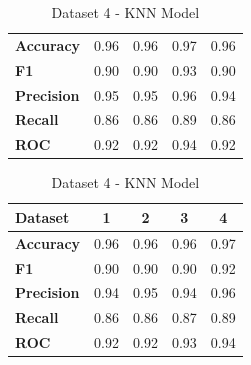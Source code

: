 \begin{table}[H]
\begin{subtable}[H]{0.45\textwidth}
\begin{tabular}{|l|c|c|c|c|}
            \hline
            \textbf{Accuracy} & 0.96 & 0.96 & 0.97 & 0.96 \\
            \textbf{F1} & 0.90 & 0.90 & 0.93 & 0.90 \\
            \textbf{Precision} & 0.95 & 0.95 & 0.96 & 0.94 \\
            \textbf{Recall} & 0.86 & 0.86 & 0.89 & 0.86 \\
            \textbf{ROC} & 0.92 & 0.92 & 0.94 & 0.92 \\
            \hline
        \end{tabular}
        \caption{Dataset 3 - KNN Model}\label{subtab:dataset_3_knn_model}
    \end{subtable}
    \quad
    \begin{subtable}[H]{0.45\textwidth}
        \centering
        \begin{tabular}{|l|c|c|c|c|}
            \hline
            \textbf{Dataset} & \textbf{1} & \textbf{2} & \textbf{3} & \textbf{4} \\
            \hline
            \textbf{Accuracy} & 0.96 & 0.96 & 0.96 & 0.97 \\
            \textbf{F1} & 0.90 & 0.90 & 0.90 & 0.92 \\
            \textbf{Precision} & 0.94 & 0.95 & 0.94 & 0.96 \\
            \textbf{Recall} & 0.86 & 0.86 & 0.87 & 0.89 \\
            \textbf{ROC} & 0.92 & 0.92 & 0.93 & 0.94 \\
            \hline
        \end{tabular}
        \caption{Dataset 4 - KNN Model}\label{subtab:dataset_4_knn_model}
    \end{subtable}
\end{table}

